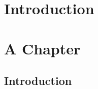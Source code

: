 \documentclass{ucetd}
\date{Graduation Date}
\title{\thesistitle}
\author{\thesisauthor}
\begin{document}
\maketitle

\makecopyright
\makededication
\makeepigraph


\tableofcontents
\listoffigures
\listoftables

\acknowledgments

\abstract

\mainmatter

\chapter{Introduction}

\chapter{A Chapter}
\section{Introduction}

\makebibliography
\nocite{*}

%
%
\end{document}
